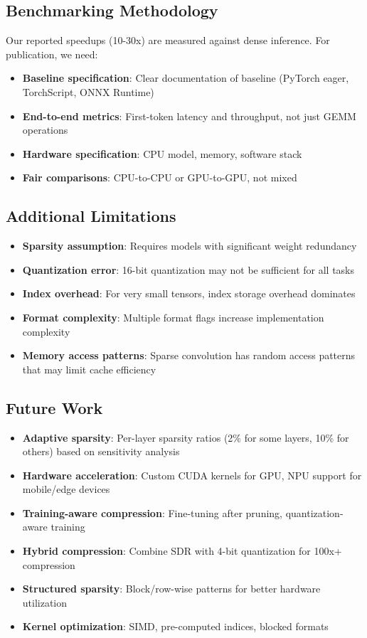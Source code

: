 \documentclass[11pt]{article}
\begin{document}
\subsection{Benchmarking Methodology}

Our reported speedups (10-30x) are measured against dense inference. For publication, we need:

\begin{itemize}
    \item \textbf{Baseline specification}: Clear documentation of baseline (PyTorch eager, TorchScript, ONNX Runtime)
    \item \textbf{End-to-end metrics}: First-token latency and throughput, not just GEMM operations
    \item \textbf{Hardware specification}: CPU model, memory, software stack
    \item \textbf{Fair comparisons}: CPU-to-CPU or GPU-to-GPU, not mixed
\end{itemize}

\subsection{Additional Limitations}

\begin{itemize}
    \item \textbf{Sparsity assumption}: Requires models with significant weight redundancy
    \item \textbf{Quantization error}: 16-bit quantization may not be sufficient for all tasks
    \item \textbf{Index overhead}: For very small tensors, index storage overhead dominates
    \item \textbf{Format complexity}: Multiple format flags increase implementation complexity
    \item \textbf{Memory access patterns}: Sparse convolution has random access patterns that may limit cache efficiency
\end{itemize}

\subsection{Future Work}

\begin{itemize}
    \item \textbf{Adaptive sparsity}: Per-layer sparsity ratios (2\% for some layers, 10\% for others) based on sensitivity analysis
    \item \textbf{Hardware acceleration}: Custom CUDA kernels for GPU, NPU support for mobile/edge devices
    \item \textbf{Training-aware compression}: Fine-tuning after pruning, quantization-aware training
    \item \textbf{Hybrid compression}: Combine SDR with 4-bit quantization for 100x+ compression
    \item \textbf{Structured sparsity}: Block/row-wise patterns for better hardware utilization
    \item \textbf{Kernel optimization}: SIMD, pre-computed indices, blocked formats
\end{itemize}
\end{document}
